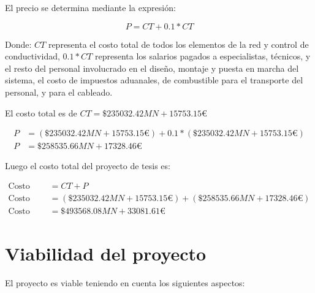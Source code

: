 El precio se determina mediante la expresión:

\begin{equation}
    P = CT + 0.1 * CT
\end{equation}

Donde: $CT$ representa el costo total de todos los elementos de la red y control de conductividad, $0.1*CT$
representa los salarios pagados a especialistas, técnicos, y el resto del personal involucrado en el diseño,
montaje y puesta en marcha del sistema, el costo de impuestos aduanales, de combustible para el transporte del
personal, y para el cableado.

El costo total es de $CT = \$235032.42MN + 15753.15€$

\begin{align*}
    P & = ( \$235032.42MN + 15753.15€) + 0.1*( \$235032.42MN + 15753.15€) \\
    P & = \$258535.66MN + 17328.46€
\end{align*}

Luego el costo total del proyecto de tesis es:

\begin{align*}
    \text{Costo total del proyecto de tesis} & = CT + P                                                    \\
    \text{Costo total del proyecto de tesis} & = (\$235032.42MN + 15753.15€) + (\$258535.66MN + 17328.46€) \\
    \text{Costo total del proyecto de tesis} & = \$493568.08MN + 33081.61€
\end{align*}


\section{Viabilidad del proyecto}

El proyecto es viable teniendo en cuenta los siguientes aspectos:

